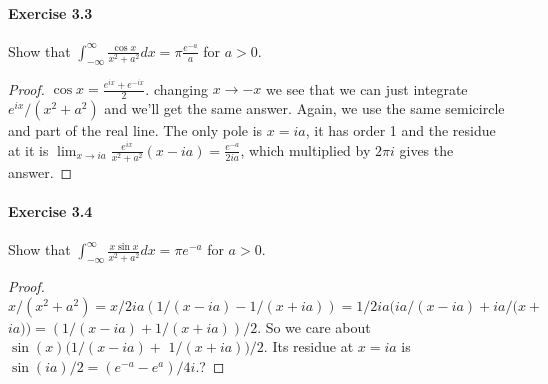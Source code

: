 \documentclass{article}
\begin{document}
\paragraph{Exercise 3.3} Show that $ \int_{-\infty}^{\infty} \frac{\cos x}{x^2 + a^2} dx = \pi \frac{e^{-a}}{a}$ for $a > 0$.
\begin{proof}
    $\cos x=\frac{e^{i x}+e^{-i x}}{2}$. changing $x \rightarrow-x$ we see that we can just integrate $e^{i x} /\left(x^2+a^2\right)$ and we'll get the same answer. Again, we use the same semicircle and part of the real line. The only pole is $x=i a$, it has order 1 and the residue at it is $\lim _{x \rightarrow i a} \frac{e^{i x}}{x^2+a^2}(x-i a)=\frac{e^{-a}}{2 i a}$, which multiplied by $2 \pi i$ gives the answer.
\end{proof}



\paragraph{Exercise 3.4} Show that $ \int_{-\infty}^{\infty} \frac{x \sin x}{x^2 + a^2} dx = \pi e^{-a}$ for $a > 0$.
\begin{proof}
$$
x /\left(x^2+a^2\right)=x / 2 i a(1 /(x-i a)-1 /(x+i a))=1 / 2 i a(i a /(x-i a)+i a /(x+
$$
$i a))=(1 /(x-i a)+1 /(x+i a)) / 2$. So we care about $\sin (x)(1 /(x-i a)+$ $1 /(x+i a)) / 2$. Its residue at $x=i a$ is $\sin (i a) / 2=\left(e^{-a}-e^a\right) / 4 i$.?
\end{proof}
\end{document}
